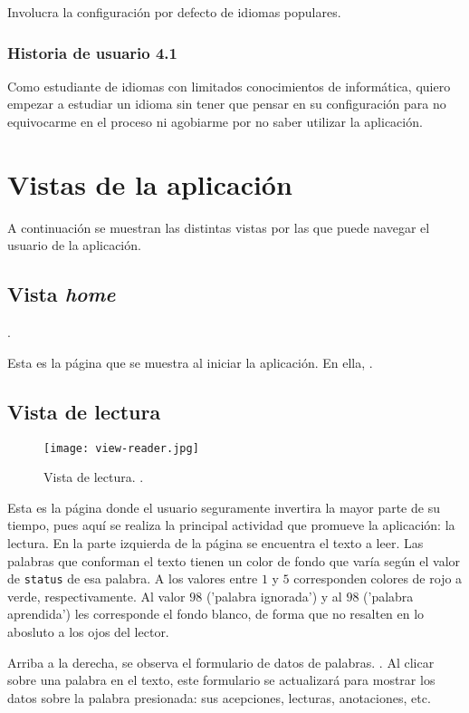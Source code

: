 Involucra la configuración por defecto de idiomas populares.

\subsubsection{Historia de usuario 4.1}

Como estudiante de idiomas con limitados conocimientos de informática, quiero empezar a estudiar un idioma sin tener que pensar en su configuración para no equivocarme en el proceso ni agobiarme por no saber utilizar la aplicación.

\section{Vistas de la aplicación}

A continuación se muestran las distintas vistas por las que puede navegar el usuario de la aplicación.

\subsection{Vista \textit{home}}

.

Esta es la página que se muestra al iniciar la aplicación. En ella, .

\subsection{Vista de lectura}

\begin{figure}[H]
	\texttt{[image: view-reader.jpg]}
	\caption[Diagrama entidad-relación]{Vista de lectura. .}
\end{figure}

Esta es la página donde el usuario seguramente invertira la mayor parte de su tiempo, pues aquí se realiza la principal actividad que promueve la aplicación: la lectura. En la parte izquierda de la página se encuentra el texto a leer. Las palabras que conforman el texto tienen un color de fondo que varía según el valor de \texttt{status} de esa palabra. A los valores entre $1$ y $5$ corresponden colores de rojo a verde, respectivamente. Al valor $98$ ('palabra ignorada') y al $98$ ('palabra aprendida') les corresponde el fondo blanco, de forma que no resalten en lo abosluto a los ojos del lector.

Arriba a la derecha, se observa el formulario de datos de palabras. . Al clicar sobre una palabra en el texto, este formulario se actualizará para mostrar los datos sobre la palabra presionada: sus acepciones, lecturas, anotaciones, etc.

